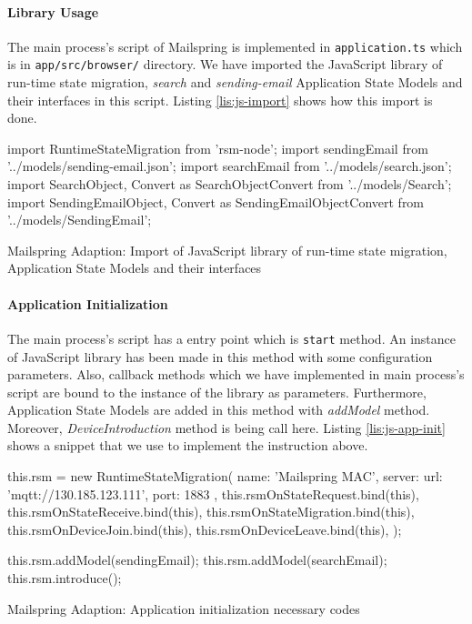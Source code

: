 
\paragraph{Library Usage}
The main process's script of Mailspring is implemented in \lstinline[basicstyle=\ttfamily]{application.ts} which is in \lstinline[basicstyle=\ttfamily]{app/src/browser/} directory.
We have imported the JavaScript library of run-time state migration, \textit{search} and \textit{sending-email} Application State Models and their interfaces in this script. Listing \ref{lis:js-import} shows how this import is done.

\FloatBarrier
\begin{code}
\begin{js2}
import RuntimeStateMigration from 'rsm-node';
import sendingEmail from '../models/sending-email.json';
import searchEmail from '../models/search.json';
import { 
    SearchObject,
    Convert as SearchObjectConvert
} from '../models/Search';
import {
    SendingEmailObject,
    Convert as SendingEmailObjectConvert
} from '../models/SendingEmail';
\end{js2}
\caption{Mailspring Adaption: Import of JavaScript library of run-time state migration, Application State Models and their interfaces}
\label{lis:js-import}
\end{code}
\FloatBarrier

\paragraph{Application Initialization}
The main process's script has a entry point which is \lstinline[basicstyle=\ttfamily]{start} method. An instance of JavaScript library has been made in this method with some configuration parameters. Also, callback methods which we have implemented in main process's script are bound to the instance of the library as parameters. Furthermore, 
Application State Models are added in this method with \textit{addModel} method. Moreover, \textit{DeviceIntroduction} method is being call here. Listing \ref{lis:js-app-init} shows a snippet that we use to implement the instruction above.

\FloatBarrier
\begin{code}
\begin{js2}
this.rsm = new RuntimeStateMigration(
  { 
    name: 'Mailspring MAC',
    server: {
        url: 'mqtt://130.185.123.111',
        port: 1883
    }
  },
  this.rsmOnStateRequest.bind(this),
  this.rsmOnStateReceive.bind(this),
  this.rsmOnStateMigration.bind(this),
  this.rsmOnDeviceJoin.bind(this),
  this.rsmOnDeviceLeave.bind(this),
);

this.rsm.addModel(sendingEmail);
this.rsm.addModel(searchEmail);
this.rsm.introduce();
\end{js2}
\caption{Mailspring Adaption: Application initialization necessary codes}
\label{lis:js-app-init}
\end{code}
\FloatBarrier

